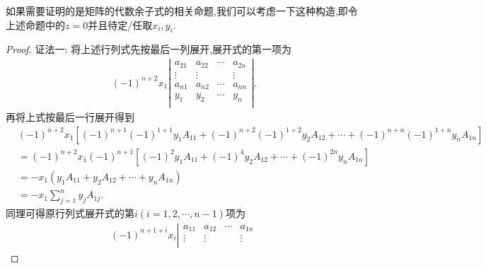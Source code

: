 \documentclass[lang=cn,newtx,10pt,scheme=chinese]{elegantbook}
\begin{document}
\begin{remark}
    如果需要证明的是矩阵的代数余子式的相关命题,我们可以考虑一下这种构造,即令上述命题中的$z=0$并且待定/任取$x_i,y_i$.
\end{remark}
\begin{proof}
{\color{blue}证法一:}
        将上述行列式先按最后一列展开,展开式的第一项为
        \begin{equation}
            \begin{split}
                \left( -1 \right) ^{n+2}x_1\left| \begin{matrix}
                    a_{21}&		a_{22}&		\cdots&		a_{2n}\\
                    \vdots&		\vdots&		&		\vdots\\
                    a_{n1}&		a_{n2}&		\cdots&		a_{nn}\\
                    y_1&		y_2&		\cdots&		y_n\\
                \end{matrix} \right|.
            \end{split}
           \nonumber
        \end{equation}
        再将上式按最后一行展开得到
        \begin{equation}
            \begin{split}
                &\left( -1 \right) ^{n+2}x_1\left[ \left( -1 \right) ^{n+1}\left( -1 \right) ^{1+1}y_1A_{11}+\left( -1 \right) ^{n+2}\left( -1 \right) ^{1+2}y_2A_{12}+\cdots +\left( -1 \right) ^{n+n}\left( -1 \right) ^{1+n}y_nA_{1n} \right]
\\
&=\left( -1 \right) ^{n+2}x_1\left( -1 \right) ^{n+1}\left[ \left( -1 \right) ^2y_1A_{11}+\left( -1 \right) ^4y_2A_{12}+\cdots +\left( -1 \right) ^{2n}y_nA_{1n} \right] 
\\
&=-x_1\left( y_1A_{11}+y_2A_{12}+\cdots +y_nA_{1n} \right)
\\
&=-x_1\sum_{j=1}^n{y_jA_{1j}}.            
            \end{split}
            \nonumber
        \end{equation}
        同理可得原行列式展开式的第$i(i=1,2,\cdots,n-1)$项为
        \begin{equation}
           \begin{split}
            \left( -1 \right) ^{n+1+i}x_i\left| \begin{matrix}
                a_{11}&		a_{12}&		\cdots&		a_{1n}\\
                \vdots&		\vdots&		&		\vdots\\

\end{matrix}
\end{split}
\end{equation}
\end{proof}
\end{document}
